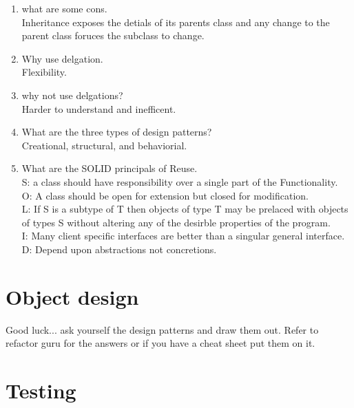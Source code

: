 \documentclass[10pt]{article}
\begin{document}
\begin{enumerate}
      \item what are some cons.\\
            Inheritance exposes the detials of its parents class and any change to the parent class foruces the subclass to change.\\

      \item Why use delgation.\\
            Flexibility.\\
      \item why not use delgations?\\
            Harder to understand and inefficent.\\


      \item What are the three types of design patterns?\\
            Creational, structural, and behaviorial.\\

      \item What are the SOLID principals of Reuse.\\
            S: a class should have responsibility over a single part of the Functionality.\\
            O: A class should be open for extension but closed for modification.\\
            L: If S is a subtype of T then objects of type T may be prelaced with objects of types S without altering any of the desirble properties of the program.\\
            I: Many client specific interfaces are better than a singular general interface.\\
            D: Depend upon abstractions not concretions.\\

\end{enumerate}
\section{Object design}
Good luck... ask yourself the design patterns and draw them out. Refer to refactor guru for the answers or if you have a cheat sheet put them on it.\\
\section{Testing}
\end{document}
